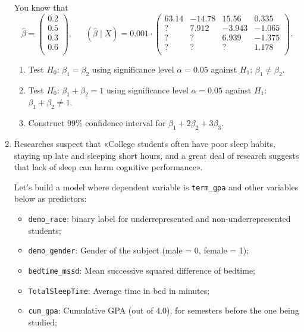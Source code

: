 \documentclass[12pt]{article}
\DeclareMathOperator{\hVar}{\widehat{\mathbb{V}ar}}
\newcommand{\hb}{\hat\beta}
\begin{document}
\begin{enumerate}
    You know that 
    \[
    \hb = \begin{pmatrix}
        0.2 \\
        0.5 \\
        0.3 \\
        0.6 \\
    \end{pmatrix}, \quad 
    \hVar(\hb \mid X) = 
    0.001 \cdot \begin{pmatrix}
        63.14 & -14.78 & 15.56 & 0.335 \\
        ?  & 7.912 & -3.943 & -1.065 \\
        ?  &   ?  &   6.939 & -1.375 \\
        ?  &   ?  &    ?  & 1.178 \\
    \end{pmatrix}.
    \]
    \begin{enumerate}
        \item Test $H_0$: $\beta_1 = \beta_2$ using significance level $\alpha = 0.05$ against $H_1$: $\beta_1 \neq \beta_2$.
        \item Test $H_0$: $\beta_1 + \beta_2 = 1$ using significance level $\alpha = 0.05$ against $H_1$: $\beta_1 + \beta_2 \neq 1$.
        \item Construct 99\% confidence interval for $\beta_1 + 2\beta_2 + 3\beta_3$.
    \end{enumerate}


    \item Researches suspect that «College students often have poor sleep habits, 
    staying up late and sleeping short hours, 
    and a great deal of research suggests that lack of sleep can harm cognitive performance». 

    Let's build a model where dependent variable is \verb|term_gpa| and other variables below as predictors:
    \begin{itemize}
    \item \verb|demo_race|: binary label for underrepresented and non-underrepresented students; 
    
    \item \verb|demo_gender|: Gender of the subject (male = 0, female = 1);
    \item \verb|bedtime_mssd|: Mean successive squared difference of bedtime;
    
    \item \verb|TotalSleepTime|: Average time in bed in minutes;
    
    \item \verb|cum_gpa|: Cumulative GPA (out of 4.0), for semesters before the one being studied;
    

\end{itemize}
\end{enumerate}
\end{document}
